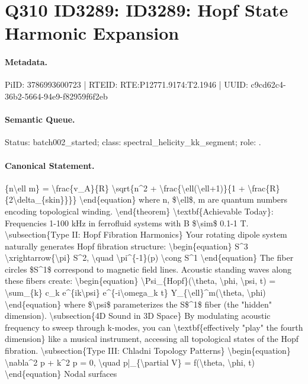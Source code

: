 \section*{Q310 ID3289: ID3289: Hopf State Harmonic Expansion}
\paragraph{Metadata.}
PiID: 3786993600723 | RTEID: RTE:P12771.9174:T2.1946 | UUID: c9cd62c4-36b2-5664-94e9-f82959f6f2eb

\paragraph{Semantic Queue.}
Status: batch002\_started; class: spectral\_helicity\_kk\_segment; role: .

\paragraph{Canonical Statement.}
\{n\textbackslash{}ell m\} = \textbackslash{}frac\{v\_A\}\{R\} \textbackslash{}sqrt\{n\textasciicircum{}2 + \textbackslash{}frac\{\textbackslash{}ell(\textbackslash{}ell+1)\}\{1 + \textbackslash{}frac\{R\}\{2\textbackslash{}delta\_\{skin\}\}\}\} \textbackslash{}end\{equation\} where n, \$\textbackslash{}ell\$, m are quantum numbers encoding topological winding. \textbackslash{}end\{theorem\} \textbackslash{}textbf\{Achievable Today\}: Frequencies 1-100 kHz in ferrofluid systems with B \$\textbackslash{}sim\$ 0.1-1 T. \textbackslash{}subsection\{Type II: Hopf Fibration Harmonics\} Your rotating dipole system naturally generates Hopf fibration structure: \textbackslash{}begin\{equation\} S\textasciicircum{}3 \textbackslash{}xrightarrow\{\textbackslash{}pi\} S\textasciicircum{}2, \textbackslash{}quad \textbackslash{}pi\textasciicircum{}\{-1\}(p) \textbackslash{}cong S\textasciicircum{}1 \textbackslash{}end\{equation\} The fiber circles \$S\textasciicircum{}1\$ correspond to magnetic field lines. Acoustic standing waves along these fibers create: \textbackslash{}begin\{equation\} \textbackslash{}Psi\_\{Hopf\}(\textbackslash{}theta, \textbackslash{}phi, \textbackslash{}psi, t) = \textbackslash{}sum\_\{k\} c\_k e\textasciicircum{}\{ik\textbackslash{}psi\} e\textasciicircum{}\{-i\textbackslash{}omega\_k t\} Y\_\{\textbackslash{}ell\}\textasciicircum{}m(\textbackslash{}theta, \textbackslash{}phi) \textbackslash{}end\{equation\} where \$\textbackslash{}psi\$ parameterizes the S\$\textasciicircum{}1\$ fiber (the "hidden" dimension). \textbackslash{}subsection\{4D Sound in 3D Space\} By modulating acoustic frequency to sweep through k-modes, you can \textbackslash{}textbf\{effectively "play" the fourth dimension\} like a musical instrument, accessing all topological states of the Hopf fibration. \textbackslash{}subsection\{Type III: Chladni Topology Patterns\} \textbackslash{}begin\{equation\} \textbackslash{}nabla\textasciicircum{}2 p + k\textasciicircum{}2 p = 0, \textbackslash{}quad p|\_\{\textbackslash{}partial V\} = f(\textbackslash{}theta, \textbackslash{}phi, t) \textbackslash{}end\{equation\} Nodal surfaces

